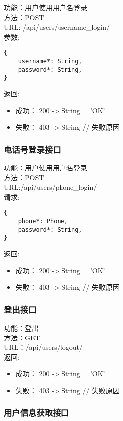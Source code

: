\noindent
功能：用户使用用户名登录\\
方法：POST\\
URL: /api/users/username\_login/\\
参数:
\begin{lstlisting}[numbers=none, frame=none]
{
    username*: String,
    password*: String,
}
\end{lstlisting}
返回:
\begin{itemize}
	\item 成功： 200 -> String = 'OK'
	\item 失败： 403 -> String // 失败原因
\end{itemize}

\subsubsection{电话号登录接口}

\noindent
功能：用户使用用户名登录\\
方法：POST\\
URL:/api/users/phone\_login/\\
请求:
\begin{lstlisting}[numbers=none, frame=none]
{
    phone*: Phone,
    password*: String,
}
\end{lstlisting}
返回:
\begin{itemize}
	\item 成功： 200 -> String = 'OK'
	\item 失败： 403 -> String // 失败原因
\end{itemize}

\subsubsection{登出接口}

\noindent
功能：登出\\
方法：GET\\
URL：/api/users/logout/\\
返回:
\begin{itemize}
	\item 成功： 200 -> String = 'OK'
	\item 失败： 403 -> String // 失败原因
\end{itemize}


\subsubsection{用户信息获取接口}

